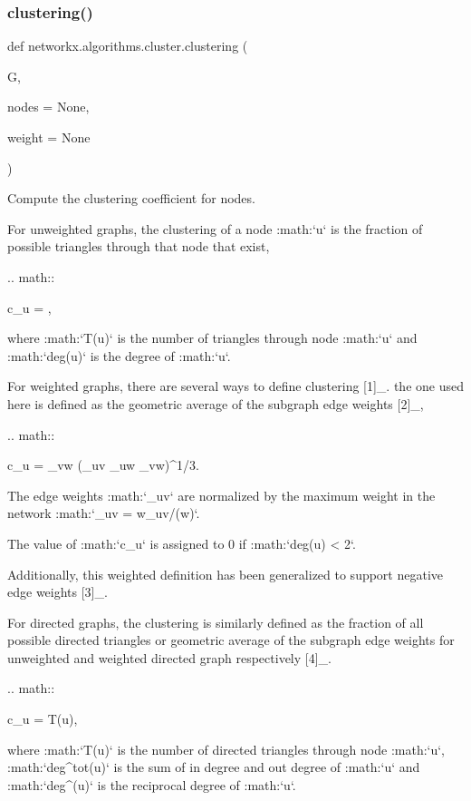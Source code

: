 \subsubsection{\texorpdfstring{clustering()}{clustering()}}
{\footnotesize\ttfamily def networkx.\+algorithms.\+cluster.\+clustering (\begin{DoxyParamCaption}\item[{}]{G,  }\item[{}]{nodes = {\ttfamily None},  }\item[{}]{weight = {\ttfamily None} }\end{DoxyParamCaption})}

\begin{DoxyVerb}Compute the clustering coefficient for nodes.

For unweighted graphs, the clustering of a node :math:`u`
is the fraction of possible triangles through that node that exist,

.. math::

  c_u = ,

where :math:`T(u)` is the number of triangles through node :math:`u` and
:math:`deg(u)` is the degree of :math:`u`.

For weighted graphs, there are several ways to define clustering [1]_.
the one used here is defined
as the geometric average of the subgraph edge weights [2]_,

.. math::

   c_u = 
         \sum_{vw} (_{uv} _{uw} _{vw})^{1/3}.

The edge weights :math:`_{uv}` are normalized by the maximum weight
in the network :math:`_{uv} = w_{uv}/\max(w)`.

The value of :math:`c_u` is assigned to 0 if :math:`deg(u) < 2`.

Additionally, this weighted definition has been generalized to support negative edge weights [3]_.

For directed graphs, the clustering is similarly defined as the fraction
of all possible directed triangles or geometric average of the subgraph
edge weights for unweighted and weighted directed graph respectively [4]_.

.. math::

   c_u = 
         T(u),

where :math:`T(u)` is the number of directed triangles through node
:math:`u`, :math:`deg^{tot}(u)` is the sum of in degree and out degree of
:math:`u` and :math:`deg^{\leftrightarrow}(u)` is the reciprocal degree of
:math:`u`.



\end{DoxyVerb}
